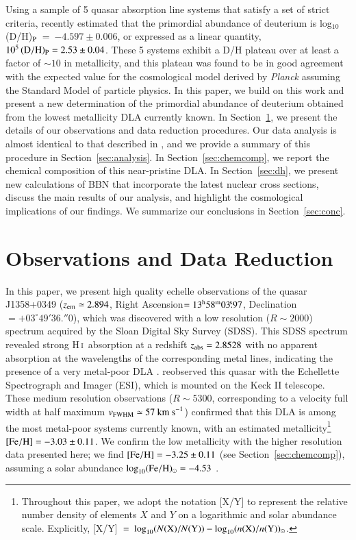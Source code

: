 \documentclass[12pt,preprint,useAMS,usenatbib]{emulateapj}
\newcommand{\dhp}{(D/H)$_{\rm P}$}
\newcommand{\HI}{\textrm{H}\,\textsc{i}}
\def\rahr{^{\rm h}}
\def\ramin{^{\rm m}}
\def\rasec{\!\!^{\rm s}}
\def\decdeg{^{\circ}}
\def\decmin{'}
\def\decsec{\!\!''}
\begin{document}
Using a sample of 5 quasar absorption line systems that satisfy a
set of strict criteria, \citet{Coo14} recently estimated that the primordial
abundance of deuterium is log$_{10}$\,\dhp~=~$-4.597\pm0.006$, or
expressed as a linear quantity, $10^{5}\,({\rm D/H})_{\rm P} = 2.53\pm0.04$.
These 5 systems exhibit a D/H plateau over at least a factor of $\sim10$ in metallicity,
and this plateau was found to be in good agreement with the expected value for the
cosmological model derived by \textit{Planck} assuming the Standard Model of particle
physics. In this paper, we build on this work and present a new determination of the
primordial abundance of deuterium obtained from the lowest metallicity DLA
currently known. In Section~\ref{sec:obs}, we present the details of our observations
and data reduction procedures. Our data analysis is almost identical to that
described in \citet{Coo14}, and we provide a summary of this procedure
in Section~\ref{sec:analysis}. In Section~\ref{sec:chemcomp}, we report
the chemical composition of this near-pristine DLA. In Section~\ref{sec:dh},
we present new calculations of BBN that incorporate the latest nuclear
cross sections, discuss the main results of our analysis, and highlight
the cosmological implications of our findings.
We summarize our conclusions in Section~\ref{sec:conc}.


\section{Observations and Data Reduction}
\label{sec:obs}

In this paper, we present high quality echelle observations of the
quasar J1358+0349 ($z_{\rm em}\simeq2.894$,
Right Ascension$=13\rahr58\ramin03.\rasec97$,
Declination$=+03\decdeg49\decmin36.\decsec0$),
which was discovered with a low resolution ($R\sim2000$) spectrum acquired by the
Sloan Digital Sky Survey (SDSS). This SDSS spectrum revealed strong \HI\ absorption
at a redshift $z_{\rm abs}=2.8528$ with no apparent absorption at the wavelengths of the
corresponding metal lines, indicating the presence of a very metal-poor DLA \citep{Pen10}.
\citet{Pen10} reobserved this quasar with the Echellette Spectrograph and Imager (ESI),
which is mounted on the Keck II telescope. These medium resolution observations
($R\sim5300$, corresponding to a velocity full width at half maximum
$v_{\rm FWHM}\simeq57~{\rm km~s}^{-1}$) confirmed that this DLA is
among the most metal-poor systems currently known, with an estimated
metallicity\footnote{Throughout this paper, we adopt the notation [X/Y] to
represent the relative number density of elements $X$ and $Y$
on a logarithmic and solar abundance scale. Explicitly,
[X/Y]~$=~\log_{10}(N({\rm X})/N({\rm Y}))-\log_{10}(n({\rm X})/n({\rm Y}))_{\odot}$.}
${\rm [Fe/H]}=-3.03\pm0.11$. We confirm the low metallicity with
the higher resolution data presented here;
we find ${\rm [Fe/H]}=-3.25\pm0.11$ (see Section~\ref{sec:chemcomp}),
assuming a solar abundance $\log_{10}({\rm Fe/H})_{\odot}=-4.53$
\citep{Asp09}.
\end{document}
